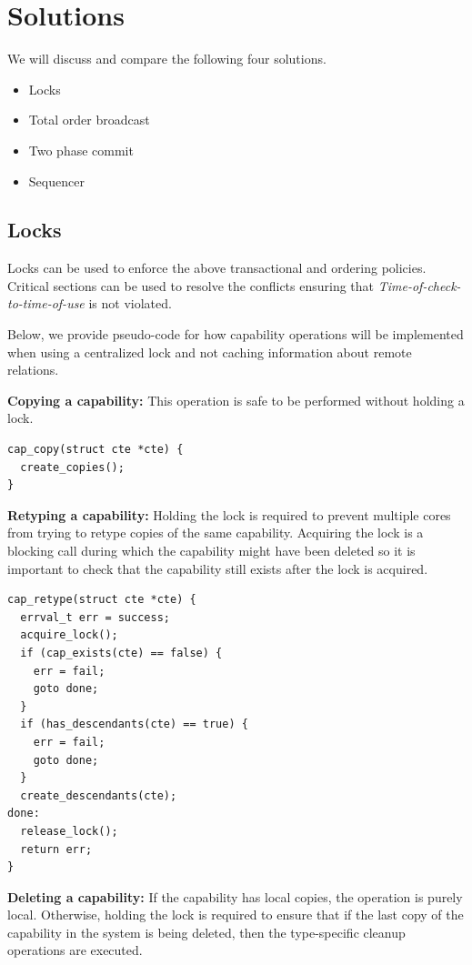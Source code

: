 \documentclass[a4paper,twoside]{report} %
\begin{document}
\section{Solutions}\label{sec:solutions}

We will discuss and compare the following four solutions.

\begin{itemize}
\item Locks
\item Total order broadcast
\item Two phase commit
\item Sequencer
\end{itemize}

\subsection{Locks}\label{subsec:locks}
Locks can be used to enforce the above transactional and ordering
policies. Critical sections can be used to resolve the conflicts
ensuring that \emph{Time-of-check-to-time-of-use} is not violated.

Below, we provide pseudo-code for how capability operations will be
implemented when using a centralized lock and not caching information
about remote relations.

\textbf{Copying a capability:} This operation is safe to be performed
without holding a lock.

\begin{verbatim}
cap_copy(struct cte *cte) {
  create_copies();
}
\end{verbatim}

\textbf{Retyping a capability:} Holding the lock is required to
prevent multiple cores from trying to retype copies of the same
capability. Acquiring the lock is a blocking call during which the
capability might have been deleted so it is important to check that
the capability still exists after the lock is acquired.

\begin{verbatim}
cap_retype(struct cte *cte) {
  errval_t err = success;
  acquire_lock();
  if (cap_exists(cte) == false) {
    err = fail;
    goto done;
  }
  if (has_descendants(cte) == true) {
    err = fail;
    goto done;
  }
  create_descendants(cte);
done:
  release_lock();
  return err;
}
\end{verbatim}

\textbf{Deleting a capability:} If the capability has local copies,
the operation is purely local. Otherwise, holding the lock is required
to ensure that if the last copy of the capability in the system is
being deleted, then the type-specific cleanup operations are executed.
\end{document}
